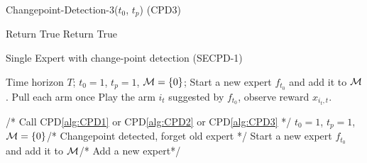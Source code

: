 \begin{algorithm}[!ht]
\caption{Changepoint-Detection-3($t_0$, $t_p$) (CPD3)}
\label{alg:CPD3}
\begin{algorithmic}
\State {}
\State Return True
\State Return True
\EndIf
\EndFor
\EndFor
\end{algorithmic}
\end{algorithm}



\begin{algorithm}[!ht]
\caption{Single Expert with change-point detection (SECPD-1)}
\label{alg:SECPD1}
\begin{algorithmic}
 Time horizon $T$; 
 $t_0 = 1$, $t_p = 1$, $\mathcal{M}=\lbrace 0\rbrace$;
 Start a new expert $f_{t_0}$ and add it to $\mathcal{M}$.
\State Pull each arm once
\State {}
\State Play the arm $i_{t}$ suggested by $f_{t_0}$, observe reward $x_{i_t,t}$.

\hspace*{4em} /* Call CPD\ref{alg:CPD1} or CPD\ref{alg:CPD2} or CPD\ref{alg:CPD3} */
 $t_0=1$, $t_p = 1$, $\mathcal{M}=\lbrace 0\rbrace$\hspace*{4em}/* Changepoint detected, forget old expert  */
\State  Start a new expert $f_{t_0}$ and add it to $\mathcal{M}$\hspace*{4em}/* Add a new expert*/
\EndIf
\EndFor
\end{algorithmic}
\end{algorithm}


